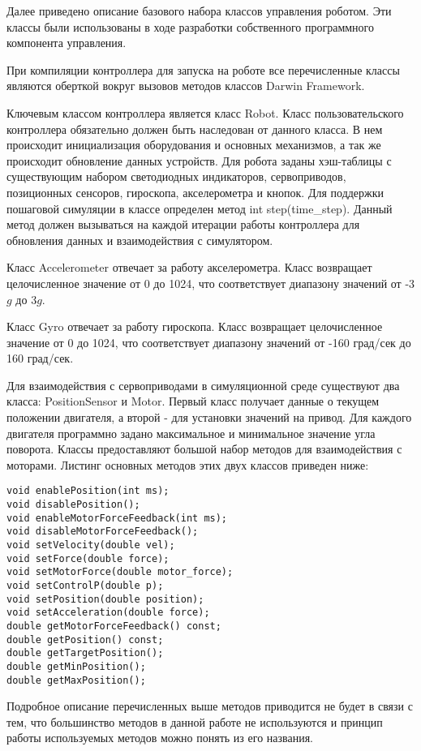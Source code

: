 Далее приведено описание базового набора классов управления роботом. Эти классы были использованы в ходе разработки собственного программного компонента управления.

При компиляции контроллера для запуска на роботе все перечисленные классы являются оберткой вокруг вызовов методов классов Darwin Framework.

Ключевым классом контроллера является класс Robot. Класс пользовательского контроллера обязательно должен быть наследован от данного класса. В нем происходит инициализация оборудования и основных механизмов, а так же происходит обновление данных устройств. Для робота заданы хэш-таблицы с существующим набором светодиодных индикаторов, сервоприводов, позиционных сенсоров, гироскопа, акселерометра и кнопок. Для поддержки пошаговой симуляции в классе определен метод int step(time\_step). Данный метод должен вызываться на каждой итерации работы контроллера для обновления данных и взаимодействия с симулятором.

Класс Accelerometer отвечает за работу акселерометра. Класс возвращает целочисленное значение от 0 до 1024, что соответствует диапазону значений от -3$g$ до 3$g$.

Класс Gyro отвечает за работу гироскопа. Класс возвращает целочисленное значение от 0 до 1024, что соответствует диапазону значений от -160 град/сек до 160 град/сек.

Для взаимодействия с сервоприводами в симуляционной среде существуют два класса: PositionSensor и Motor. Первый класс получает данные о текущем положении двигателя, а второй - для установки значений на привод. Для каждого двигателя программно задано максимальное и минимальное значение угла поворота. Классы предоставляют большой набор методов для взаимодействия с моторами. Листинг основных методов этих двух классов приведен ниже:

\lstset{language=C++}
\begin{lstlisting}
void enablePosition(int ms);
void disablePosition();
void enableMotorForceFeedback(int ms);
void disableMotorForceFeedback();
void setVelocity(double vel);
void setForce(double force);
void setMotorForce(double motor_force);
void setControlP(double p);
void setPosition(double position);
void setAcceleration(double force);
double getMotorForceFeedback() const;
double getPosition() const;
double getTargetPosition();
double getMinPosition();
double getMaxPosition();
\end{lstlisting}

Подробное описание перечисленных выше методов приводится не будет в связи с тем, что большинство методов в данной работе не используются и принцип работы используемых методов можно понять из его названия.

